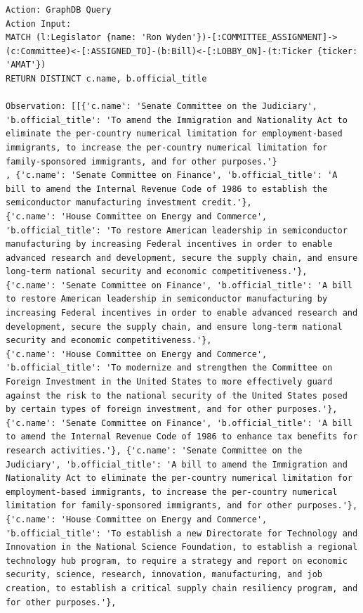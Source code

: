 \documentclass[15pt,letterpaper]{article}
\begin{document}
\begin{Verbatim}[breaklines=true, frame=single]
Action: GraphDB Query
Action Input: 
MATCH (l:Legislator {name: 'Ron Wyden'})-[:COMMITTEE_ASSIGNMENT]->(c:Committee)<-[:ASSIGNED_TO]-(b:Bill)<-[:LOBBY_ON]-(t:Ticker {ticker: 'AMAT'})
RETURN DISTINCT c.name, b.official_title

Observation: [[{'c.name': 'Senate Committee on the Judiciary', 'b.official_title': 'To amend the Immigration and Nationality Act to eliminate the per-country numerical limitation for employment-based immigrants, to increase the per-country numerical limitation for family-sponsored immigrants, and for other purposes.'}
, {'c.name': 'Senate Committee on Finance', 'b.official_title': 'A bill to amend the Internal Revenue Code of 1986 to establish the semiconductor manufacturing investment credit.'}, 
{'c.name': 'House Committee on Energy and Commerce', 'b.official_title': 'To restore American leadership in semiconductor manufacturing by increasing Federal incentives in order to enable advanced research and development, secure the supply chain, and ensure long-term national security and economic competitiveness.'}, 
{'c.name': 'Senate Committee on Finance', 'b.official_title': 'A bill to restore American leadership in semiconductor manufacturing by increasing Federal incentives in order to enable advanced research and development, secure the supply chain, and ensure long-term national security and economic competitiveness.'}, 
{'c.name': 'House Committee on Energy and Commerce', 'b.official_title': 'To modernize and strengthen the Committee on Foreign Investment in the United States to more effectively guard against the risk to the national security of the United States posed by certain types of foreign investment, and for other purposes.'}, 
{'c.name': 'Senate Committee on Finance', 'b.official_title': 'A bill to amend the Internal Revenue Code of 1986 to enhance tax benefits for research activities.'}, {'c.name': 'Senate Committee on the Judiciary', 'b.official_title': 'A bill to amend the Immigration and Nationality Act to eliminate the per-country numerical limitation for employment-based immigrants, to increase the per-country numerical limitation for family-sponsored immigrants, and for other purposes.'}, 
{'c.name': 'House Committee on Energy and Commerce', 'b.official_title': 'To establish a new Directorate for Technology and Innovation in the National Science Foundation, to establish a regional technology hub program, to require a strategy and report on economic security, science, research, innovation, manufacturing, and job creation, to establish a critical supply chain resiliency program, and for other purposes.'}, 

\end{Verbatim}
\end{document}
